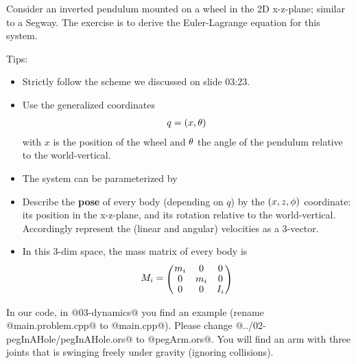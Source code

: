 

\renewcommand{\course}{Robotics}
\renewcommand{\coursepicture}{roboticsLecture}
\renewcommand{\coursedate}{Winter 2014}
\renewcommand{\exnum}{6}

\exercises




Consider an inverted pendulum mounted on a wheel in the 2D x-z-plane;
similar to a Segway. The exercise is to derive the Euler-Lagrange
equation for this system.

Tips:
\begin{itemize}
\item Strictly follow the scheme we discussed on slide 03:23.
\item Use the generalized coordinates
\begin{align}
q=(x,\theta)
\end{align}
with $x$ is the position of the wheel and $\theta$ the angle of the
pendulum relative to the world-vertical.
\item The system can be parameterized by
\item Describe the \textbf{pose} of every body (depending on $q$) by
the $(x,z,\phi)$ coordinate: its position in the x-z-plane, and its
rotation relative to the world-vertical. Accordingly represent the
(linear and angular) velocities as a 3-vector.
\item In this 3-dim space, the mass matrix of every body is
\begin{align}
M_i = \mat{ccc}{m_i & 0 & 0 \\ 0 & m_i & 0 \\ 0 & 0 & I_i}
\end{align}
\end{itemize}



In our code, in @03-dynamics@ you find an example (rename
@main.problem.cpp@ to @main.cpp@). Please change
@../02-pegInAHole/pegInAHole.ors@ to @pegArm.ors@. You will find an
arm with three joints that is swinging freely under gravity (ignoring
collisions).

